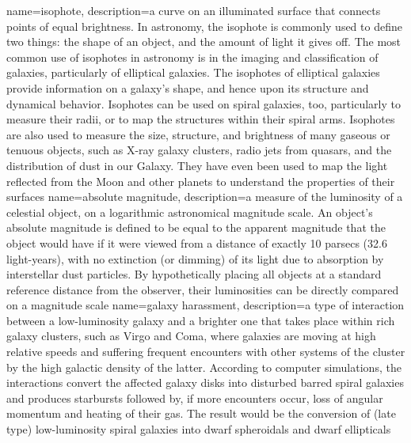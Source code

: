 {
	name={isophote},
	description={a curve on an illuminated surface that connects points of equal brightness. In astronomy, the isophote is commonly used to define two things: the shape of an object, and the amount of light it gives off. The most common use of isophotes in astronomy is in the imaging and classification of galaxies, particularly of elliptical galaxies. The isophotes of elliptical galaxies provide information on a galaxy's shape, and hence upon its structure and dynamical behavior. Isophotes can be used on spiral galaxies, too, particularly to measure their radii, or to map the structures within their spiral arms. Isophotes are also used to measure the size, structure, and brightness of many gaseous or tenuous objects, such as X-ray galaxy clusters, radio jets from quasars, and the distribution of dust in our Galaxy. They have even been used to map the light reflected from the Moon and other planets to understand the properties of their surfaces}
}
{
	name={absolute magnitude},
	description={a measure of the luminosity of a celestial object, on a logarithmic astronomical magnitude scale. An object's absolute magnitude is defined to be equal to the apparent magnitude that the object would have if it were viewed from a distance of exactly 10 parsecs (32.6 light-years), with no extinction (or dimming) of its light due to absorption by interstellar dust particles. By hypothetically placing all objects at a standard reference distance from the observer, their luminosities can be directly compared on a magnitude scale}
} 
{
	name={galaxy harassment},
	description={a type of interaction between a low-luminosity galaxy and a brighter one that takes place within rich galaxy clusters, such as Virgo and Coma, where galaxies are moving at high relative speeds and suffering frequent encounters with other systems of the cluster by the high galactic density of the latter. According to computer simulations, the interactions convert the affected galaxy disks into disturbed barred spiral galaxies and produces starbursts followed by, if more encounters occur, loss of angular momentum and heating of their gas. The result would be the conversion of (late type) low-luminosity spiral galaxies into dwarf spheroidals and dwarf ellipticals}
}